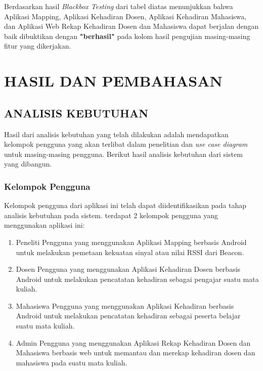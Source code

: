 \begin{enumerate}[a.]
\par Berdasarkan hasil \textit{Blackbox Testing} dari tabel diatas menunjukkan bahwa Aplikasi Mapping, Aplikasi Kehadiran Dosen, Aplikasi Kehadiran Mahasiswa, dan Aplikasi Web Rekap Kehadiran Dosen dan Mahasiswa dapat berjalan dengan baik dibuktikan dengan  \textbf{"berhasil"} pada kolom hasil pengujian masing-masing fitur yang dikerjakan.


%
\fancyhf{}
\fancyfoot[C]{\thepage}
\chapter{HASIL DAN PEMBAHASAN}
\section{\uppercase{ANALISIS KEBUTUHAN}}

Hasil dari analisis kebutuhan yang telah dilakukan adalah mendapatkan kelompok pengguna yang akan terlibat dalam penelitian dan \textit{use case diagram} untuk masing-masing pengguna. Berikut hasil analisis kebutuhan dari sistem yang dibangun.

\subsection{Kelompok Pengguna}
Kelompok pengguna dari aplikasi ini telah dapat diidentifikasikan pada tahap analisis kebutuhan pada sistem. terdapat 2 kelompok pengguna yang menggunakan aplikasi ini:
\begin{enumerate}[1.]
	\item Peneliti
	      \newline Pengguna yang menggunakan Aplikasi Mapping berbasis Android untuk melakukan pemetaan kekuatan sinyal atau nilai RSSI dari Beacon.
	\item Dosen
	      \newline Pengguna yang menggunakan Aplikasi Kehadiran Dosen berbasis Android untuk melakukan pencatatan kehadiran sebagai pengajar suatu mata kuliah.
	\item Mahasiswa
	      \newline Pengguna yang menggunakan Aplikasi Kehadiran berbasis Android untuk melakukan pencatatan kehadiran sebagai peserta belajar suatu mata kuliah.
	\item Admin
	      \newline Pengguna yang menggunakan Aplikasi Rekap Kehadiran Dosen dan Mahasiswa berbasis web untuk memantau dan merekap kehadiran dosen dan mahasiswa pada suatu mata kuliah.
\end{enumerate}


\end{enumerate}
